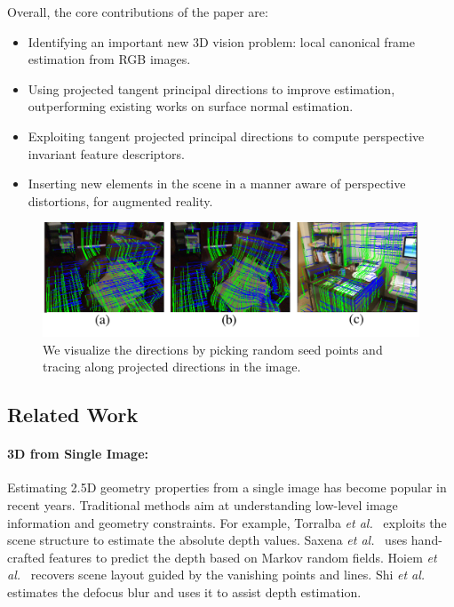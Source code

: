 Overall, the core contributions of the paper are:
     \vspace{-0.05in}
\begin{itemize}
     \item Identifying an important new 3D vision problem: local canonical frame estimation from RGB images.
    \vspace{-0.1in}
    \item Using projected tangent principal directions to improve \cframe{} estimation, outperforming existing works on surface normal estimation.
    \vspace{-0.1in}
    \item Exploiting tangent projected principal directions to compute perspective invariant feature descriptors.
    \vspace{-0.1in}
    \item Inserting new elements in the scene in a manner aware of perspective distortions, for augmented reality.
\end{itemize}
\begin{figure}
    \centering
    \includegraphics[width=\linewidth]{FrameNet/graph/illus.pdf}
    \vspace{-0.3in}
    \caption{We visualize the directions by picking random seed points and tracing along projected directions in the image. }
    \label{fig:vis-direction}
    \vspace{-0.1in}
\end{figure}

\subsection{Related Work}
\label{related:framenet}
\paragraph*{3D from Single Image:}
Estimating 2.5D geometry properties from a single image has become popular in recent years. Traditional methods aim at understanding low-level image information and geometry constraints. For example, Torralba \textit{et al.}~\cite{torralba2002depth} exploits the scene structure to estimate the absolute depth values. Saxena \textit{et al.}~\cite{saxena2006learning} uses hand-crafted features to predict the depth based on Markov random fields. Hoiem \textit{et al.}~\cite{hoiem2007recovering} recovers scene layout guided by the vanishing points and lines. Shi \textit{et al.}~\cite{shi2015break} estimates the defocus blur and uses it to assist depth estimation.

